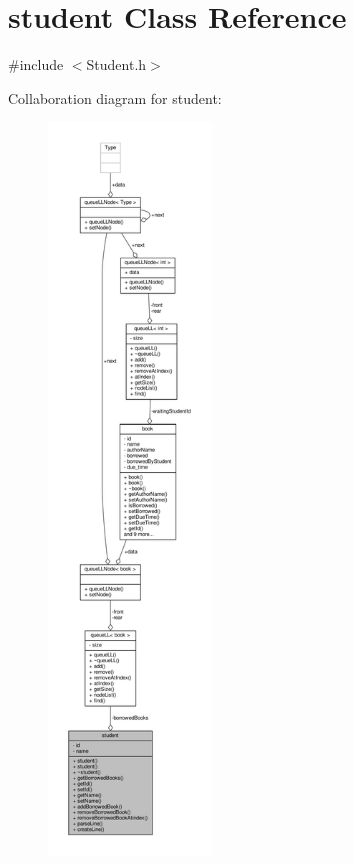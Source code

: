 \hypertarget{classstudent}{}\section{student Class Reference}
\label{classstudent}


{\ttfamily \#include $<$Student.\+h$>$}



Collaboration diagram for student\+:
\nopagebreak
\begin{figure}[H]
\begin{center}
\leavevmode
\includegraphics[height=550pt]{classstudent__coll__graph}
\end{center}
\end{figure}
